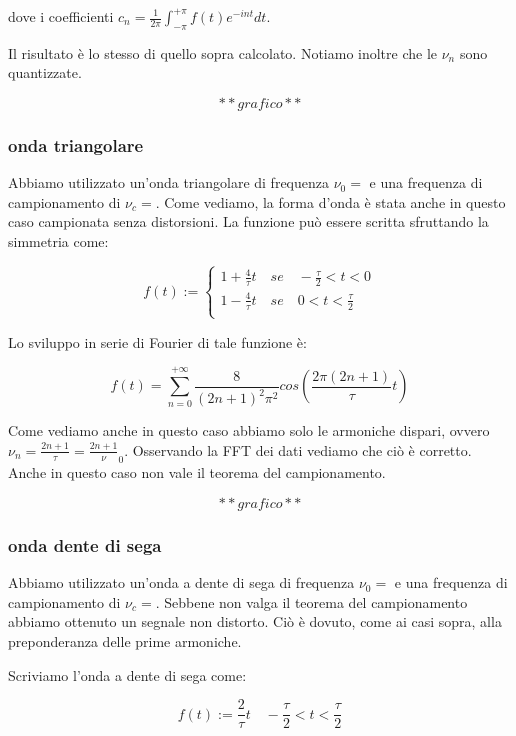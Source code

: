 dove i coefficienti $c_n=\frac{1}{2\pi}\int_{-\pi}^{+\pi} f(t)e^{-int}dt$.

Il risultato è lo stesso di quello sopra calcolato. Notiamo inoltre che le $\nu_n$ sono quantizzate.

$$**grafico**$$


\subsubsection{onda triangolare}
Abbiamo utilizzato un'onda triangolare di frequenza $\nu_0=$ e una frequenza di campionamento di $\nu_c=$. Come vediamo, la forma d'onda è stata anche in questo caso campionata senza distorsioni. La funzione può essere scritta sfruttando la simmetria come:

\begin{displaymath}
f(t):=
\begin{cases}
1+\frac{4}{\tau}t \quad se \quad -\frac{\tau}{2}<t<0 \\
1-\frac{4}{\tau}t \quad se \quad 0<t<\frac{\tau}{2} \\ 
\end{cases}
\end{displaymath}

Lo sviluppo in serie di Fourier di tale funzione è:

\begin{equation}
f(t)=\sum_{n=0}^{+\infty}\frac{8}{(2n+1)^2\pi^2}cos (\frac{2\pi(2n+1)}{\tau}t)
\end{equation}

Come vediamo anche in questo caso abbiamo solo le armoniche dispari, ovvero $\nu_n=\frac{2n+1}{\tau}=\frac{2n+1}\nu_0$. Osservando la FFT dei dati vediamo che ciò è corretto. Anche in questo caso non vale il teorema del campionamento.

$$**grafico**$$

\subsubsection{onda dente di sega}

Abbiamo utilizzato un'onda a dente di sega di frequenza $\nu_0=$ e una frequenza di campionamento di $\nu_c=$. Sebbene non valga il teorema del campionamento abbiamo ottenuto un segnale non distorto. Ciò è dovuto, come ai casi sopra, alla preponderanza delle prime armoniche.

Scriviamo l'onda a dente di sega come: 

$$f(t):= \frac{2}{\tau}t \quad -\frac{\tau}{2}<t<\frac{\tau}{2}$$

